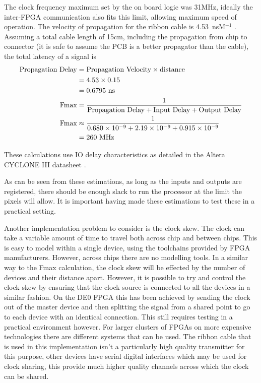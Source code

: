 The clock frequency maximum set by the on board logic was 31MHz, ideally the inter-FPGA communication also fits this limit, allowing maximum speed of operation. The velocity of propagation for the ribbon cable is 4.53~nsM${^{-1}}$ \cite{ribbon}. Assuming a total cable length of 15cm, including the propagation from chip to connector (it is safe to assume the PCB is a better propagator than the cable), the total latency of a signal is 
\begin{align*}
\text{Propagation Delay} &= \text{Propagation Velocity} \times \text{distance} \\
&= 4.53 \times 0.15 \\ 
&= 0.6795~\text{ns} \\
\text{Fmax} &= \frac{1}{\text{Propagation Delay} + \text{Input Delay} + \text{Output Delay}} \\
\text{Fmax} &\approx  \frac{1}{0.680 \times 10^{-9} + 2.19 \times 10^{-9} + 0.915 \times 10^{-9}} \\
\vspace{5em}
&= 260~\text{MHz}
\end{align*}

These calculations use IO delay characteristics as detailed in the Altera CYCLONE III datasheet \cite{altcyc}.

As can be seen from these estimations, as long as the inputs and outputs are registered, there should be enough slack to run the processor at the limit the pixels will allow. It is important having made these estimations to test these in a practical setting.


Another implementation problem to consider is the clock skew. The clock can take a variable amount of time to travel both across chip and between chips. This is easy to model within a single device, using the toolchains provided by FPGA manufacturers. However, across chips there are no modelling tools. In a similar way to the Fmax calculation, the clock skew will be effected by the number of devices and their distance apart. However, it is possible to try and control the clock skew by ensuring that the clock source is connected to all the devices in a similar fashion. On the DE0 FPGA this has been achieved by sending the clock out of the master device and then splitting the signal from a shared point to go to each device with an identical connection. This still requires testing in a practical environment however. For larger clusters of FPGAs on more expensive technologies there are different systems that can be used. The ribbon cable that is used in this implementation isn't a particularly high quality transmitter for this purpose, other devices have serial digital interfaces which may be used for clock sharing, this provide much higher quality channels across which the clock can be shared.


